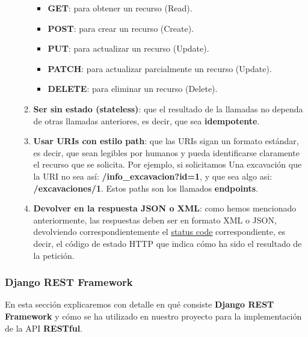 \begin{itemize}
\begin{enumerate}
                    \begin{itemize}
                        \item \textbf{GET}: para obtener un recurso (Read).
                        \item \textbf{POST}: para crear un recurso (Create).
                        \item \textbf{PUT}: para actualizar un recurso (Update).
                        \item \textbf{PATCH}: para actualizar parcialmente un
                        recurso (Update).
                        \item \textbf{DELETE}: para eliminar un recurso (Delete).
                    \end{itemize}

                \item \textbf{Ser sin estado (stateless)}: que el resultado de la llamadas
                no dependa de otras llamadas anteriores, es decir, que sea
                \textbf{idempotente}.
                \item \textbf{Usar URIs con estilo path}: que las URIs sigan un formato
                estándar, es decir, que sean legibles por humanos y pueda identificarse
                claramente el recurso que se solicita. Por ejemplo, si solicitamos Una
                excavación que la URI no sea así: \textbf{/info\_excavacion?id=1}, y que
                sea algo asi: \textbf{/excavaciones/1}. Estos paths son los llamados
                \textbf{endpoints}.
                \item \textbf{Devolver en la respuesta JSON o XML}: como hemos mencionado
                anteriormente, las respuestas deben ser en formato XML o JSON,
                devolviendo correspondientemente el
                \href{https://developer.mozilla.org/es/docs/Web/HTTP/Status}{status code}
                correspondiente, es decir, el código de estado HTTP que indica cómo ha
                sido el resultado de la petición.
            \end{enumerate}
    \end{itemize}

\subsubsection{Django REST Framework}
En esta sección explicaremos con detalle  en qué consiste \textbf{Django REST Framework}
\cite{djangorestframework} y cómo se ha utilizado en nuestro proyecto para la
implementación de la API \textbf{RESTful}.\\

